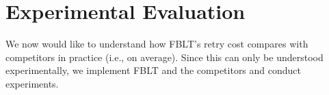 \documentclass[conference,letterpaper]{IEEEtran}
\begin{document}
\section{Experimental Evaluation}\label{exp_eval}

We now would like to understand how FBLT's retry cost compares with competitors in practice (i.e., on average). Since this can only be understood experimentally, we implement FBLT and the competitors and conduct experiments. 

\end{document}
